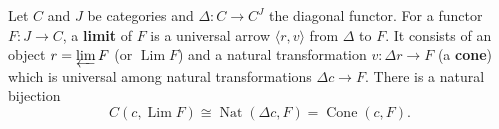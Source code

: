 Let $C$ and $J$ be categories and $\Delta: C \to C^J$ the diagonal functor. For a functor $F: J \to C$, a \textbf{limit} of $F$ is a universal arrow $\langle r, v \rangle$ from $\Delta$ to $F$. It consists of an object $r = \varprojlim F$ (or $\operatorname{Lim} F$) and a natural transformation $v: \Delta r \to F$ (a \textbf{cone}) which is universal among natural transformations $\Delta c \to F$. There is a natural bijection
$$C(c, \operatorname{Lim} F) \cong \operatorname{Nat}(\Delta c, F) = \operatorname{Cone}(c, F).$$